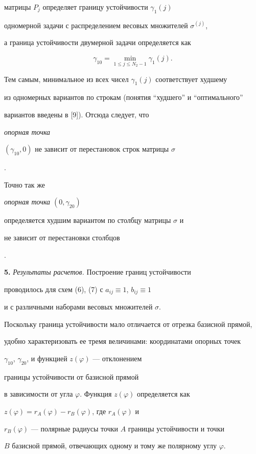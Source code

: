 матрицы $P_{j}$ определяет границу устойчивости $\gamma_{1}(j)$


одномерной задачи с распределением весовых множителей $\sigma^{(j)}$,


а граница устойчивости двумерной задачи определяется как


$$


\gamma_{10}=\min_{1\le j\le N_{2}-1} \gamma_{1}(j).


$$





Тем самым, минимальное из всех чисел $\gamma_{1}(j)$ соответствует худшему


из одномерных вариантов по строкам (понятия ``худшего'' и ``оптимального''


вариантов введены в [9]). Отсюда следует, что


{\it опорная точка


$(\gamma_{10},0)$ не зависит от перестановок строк матрицы $\sigma$}.


Точно так же {\it опорная точка $(0,\gamma_{20})$


определяется худшим вариантом по столбцу матрицы $\sigma$ и


не зависит от перестановки столбцов}.


\medskip





{\bf 5.} {\it Результаты расчетов.} Построение границ устойчивости


проводилось для схем (6), (7) с $a_{ij} \equiv 1$, $b_{ij} \equiv 1$


и с различными наборами весовых множителей $\sigma$.


Поскольку граница устойчивости мало отличается от отрезка базисной прямой,


удобно характеризовать ее тремя величинами: координатами опорных точек


$\gamma_{10}$, $\gamma_{20}$, и функцией $z(\varphi)$ --- отклонением 


границы устойчивости от базисной прямой


в зависимости от угла $\varphi$. Функция $z(\varphi)$ определяется как


$z(\varphi) = r_A(\varphi) - r_B(\varphi)$, где $r_A(\varphi)$ и


$r_B(\varphi)$ --- полярные радиусы точки $A$ границы устойчивости и точки


$B$ базисной прямой, отвечающих одному и тому же полярному углу $\varphi$.


